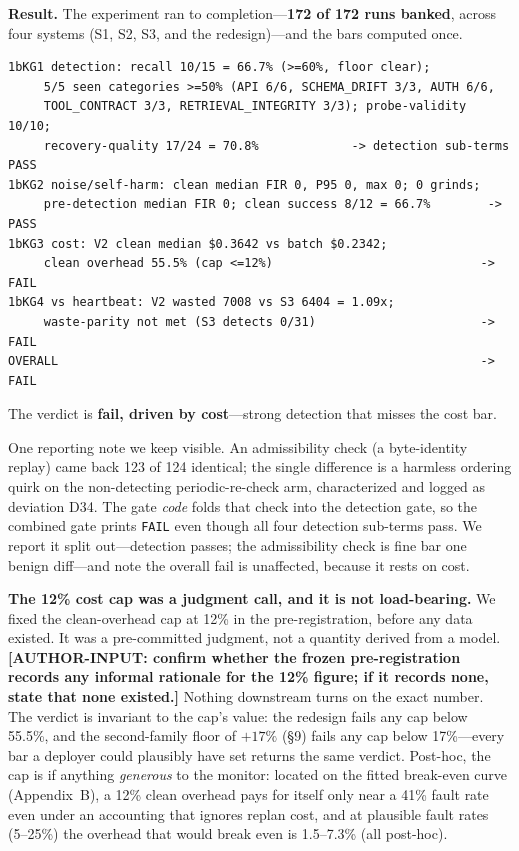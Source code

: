 \documentclass[acmsmall,screen]{acmart}
\begin{document}
\textbf{Result.} The experiment ran to completion---\textbf{172 of 172 runs
banked}, across four systems (S1, S2, S3, and the redesign)---and the bars
computed once.

\begin{lstlisting}
1bKG1 detection: recall 10/15 = 66.7% (>=60%, floor clear);
     5/5 seen categories >=50% (API 6/6, SCHEMA_DRIFT 3/3, AUTH 6/6,
     TOOL_CONTRACT 3/3, RETRIEVAL_INTEGRITY 3/3); probe-validity 10/10;
     recovery-quality 17/24 = 70.8%             -> detection sub-terms PASS
1bKG2 noise/self-harm: clean median FIR 0, P95 0, max 0; 0 grinds;
     pre-detection median FIR 0; clean success 8/12 = 66.7%        -> PASS
1bKG3 cost: V2 clean median $0.3642 vs batch $0.2342;
     clean overhead 55.5% (cap <=12%)                             -> FAIL
1bKG4 vs heartbeat: V2 wasted 7008 vs S3 6404 = 1.09x;
     waste-parity not met (S3 detects 0/31)                       -> FAIL
OVERALL                                                           -> FAIL
\end{lstlisting}

The verdict is \textbf{fail, driven by cost}---strong detection that misses the
cost bar.

One reporting note we keep visible. An admissibility check (a byte-identity
replay) came back 123 of 124 identical; the single difference is a harmless
ordering quirk on the non-detecting periodic-re-check arm, characterized and
logged as deviation D34. The gate \emph{code} folds that check into the
detection gate, so the combined gate prints \texttt{FAIL} even though all four
detection sub-terms pass. We report it split out---detection passes; the
admissibility check is fine bar one benign diff---and note the overall fail is
unaffected, because it rests on cost.

\textbf{The 12\% cost cap was a judgment call, and it is not load-bearing.} We fixed
the clean-overhead cap at 12\% in the pre-registration, before any data existed. It was
a pre-committed judgment, not a quantity derived from a model.
\textbf{[AUTHOR-INPUT: confirm whether the frozen pre-registration records any informal
rationale for the 12\% figure; if it records none, state that none existed.]} Nothing
downstream turns on the exact number. The verdict is invariant to the cap's value: the
redesign fails any cap below 55.5\%, and the second-family floor of $+17\%$ (\S9) fails
any cap below 17\%---every bar a deployer could plausibly have set returns the same
verdict. Post-hoc, the cap is if anything \emph{generous} to the monitor: located on the
fitted break-even curve (Appendix~B), a 12\% clean overhead pays for itself only near a
41\% fault rate even under an accounting that ignores replan cost, and at plausible fault
rates (5--25\%) the overhead that would break even is 1.5--7.3\% (all post-hoc).
\end{document}
